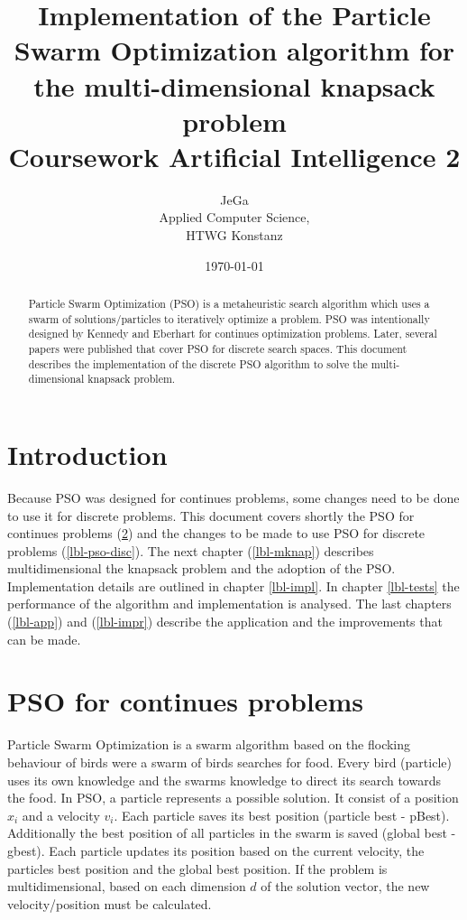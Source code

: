 \documentclass{article}
\begin{document}
\title{Implementation of the Particle Swarm Optimization algorithm for the multi-dimensional knapsack problem \\
\vspace{2 mm} {\large Coursework Artificial Intelligence 2}}
\author{JeGa\\
        Applied Computer Science,\\
		HTWG Konstanz}
\date{\today}
\maketitle

\begin{abstract}
Particle Swarm Optimization (PSO) is a metaheuristic search algorithm which uses a swarm of solutions/particles to iteratively optimize a problem. PSO was intentionally designed by Kennedy and Eberhart \cite{bib-continues} for continues optimization problems. Later, several papers were published that cover PSO for discrete search spaces. This document describes the implementation of the discrete PSO algorithm to solve the multi-dimensional knapsack problem.
\end{abstract}

\newpage
\cfoot[\thepage]{}

\tableofcontents

\newpage

\section{Introduction}
\label{lbl-intro}
Because PSO was designed for continues problems, some changes need to be done to use it for discrete problems. This document covers shortly the PSO for continues problems (\ref{lbl-pso-cont}) and the changes to be made to use PSO for discrete problems (\ref{lbl-pso-disc}). The next chapter (\ref{lbl-mknap}) describes multidimensional the knapsack problem and the adoption of the PSO.
Implementation details are outlined in chapter \ref{lbl-impl}. In chapter \ref{lbl-tests} the performance of the algorithm and implementation is analysed. The last chapters (\ref{lbl-app}) and (\ref{lbl-impr}) describe the application and the improvements that can be made.

\section{PSO for continues problems}
\label{lbl-pso-cont}
Particle Swarm Optimization is a swarm algorithm based on the flocking behaviour of birds were a swarm of birds searches for food. Every bird (particle) uses its own knowledge and the swarms knowledge to direct its search towards the food. In PSO, a particle represents a possible solution. It consist of a position $x_i$ and a velocity $v_i$. Each particle saves its best position (particle best - pBest). Additionally the best position of all particles in the swarm is saved (global best - gbest). Each particle updates its position based on the current velocity, the particles best position and the global best position. If the problem is multidimensional, based on each dimension $d$ of the solution vector, the new velocity/position must be calculated.
\end{document}
